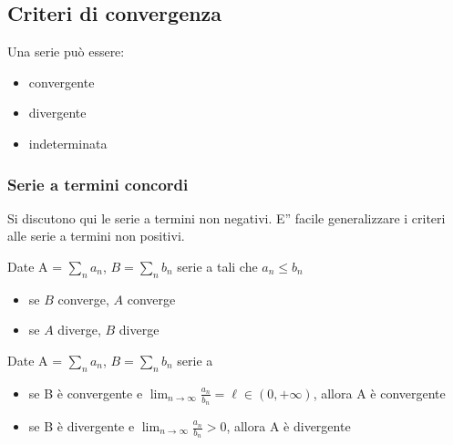 \documentclass[letterpaper,10pt,italian]{jupyterBook}
\begin{document}
\subsection{Criteri di convergenza}
\label{\detokenize{ch/series:id1}}
\sphinxAtStartPar
Una serie può essere:
\begin{itemize}
\item {} 
\sphinxAtStartPar
convergente

\item {} 
\sphinxAtStartPar
divergente

\item {} 
\sphinxAtStartPar
indeterminata

\end{itemize}


\subsubsection{Serie a termini concordi}
\label{\detokenize{ch/series:serie-a-termini-concordi}}
\sphinxAtStartPar
Si discutono qui le serie a termini non negativi. E” facile generalizzare i criteri alle serie a termini non positivi.

\sphinxAtStartPar
{} Date A = \(\sum_n a_n\), \(B =\sum_n b_n\) serie a  tali che \(a_n \le b_n\)
\begin{itemize}
\item {} 
\sphinxAtStartPar
se \(B\) converge, \(A\) converge

\item {} 
\sphinxAtStartPar
se \(A\)  diverge, \(B\)  diverge

\end{itemize}

\sphinxAtStartPar
{} Date A = \(\sum_n a_n\), \(B =\sum_n b_n\) serie a 
\begin{itemize}
\item {} 
\sphinxAtStartPar
se B è convergente e \(\lim_{n \rightarrow \infty} \frac{a_n}{b_n} = \ell \in (0, +\infty)\), allora A è convergente

\item {} 
\sphinxAtStartPar
se B è  divergente e \(\lim_{n \rightarrow \infty} \frac{a_n}{b_n} > 0\), allora A è  divergente

\end{itemize}

\sphinxAtStartPar
{}
\end{document}
